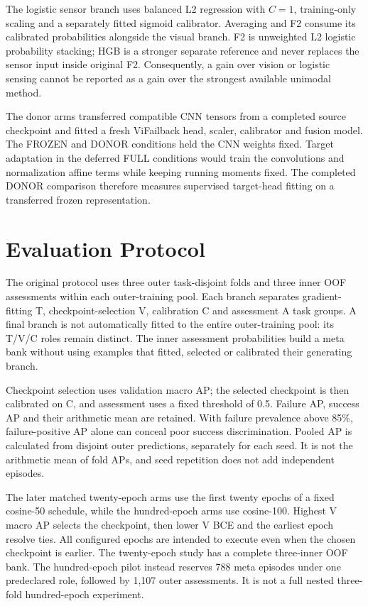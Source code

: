 The logistic sensor branch uses balanced L2 regression with $C=1$, training-only scaling and a separately fitted sigmoid calibrator. Averaging and F2 consume its calibrated probabilities alongside the visual branch. F2 is unweighted L2 logistic probability stacking; HGB is a stronger separate reference and never replaces the sensor input inside original F2. Consequently, a gain over vision or logistic sensing cannot be reported as a gain over the strongest available unimodal method.

The donor arms transferred compatible CNN tensors from a completed source checkpoint and fitted a fresh ViFailback head, scaler, calibrator and fusion model. The FROZEN and DONOR conditions held the CNN weights fixed. Target adaptation in the deferred FULL conditions would train the convolutions and normalization affine terms while keeping running moments fixed. The completed DONOR comparison therefore measures supervised target-head fitting on a transferred frozen representation.

\section{Evaluation Protocol}
The original protocol uses three outer task-disjoint folds and three inner OOF assessments within each outer-training pool. Each branch separates gradient-fitting T, checkpoint-selection V, calibration C and assessment A task groups. A final branch is not automatically fitted to the entire outer-training pool: its T/V/C roles remain distinct. The inner assessment probabilities build a meta bank without using examples that fitted, selected or calibrated their generating branch.

Checkpoint selection uses validation macro AP; the selected checkpoint is then calibrated on C, and assessment uses a fixed threshold of 0.5. Failure AP, success AP and their arithmetic mean are retained. With failure prevalence above 85\%, failure-positive AP alone can conceal poor success discrimination. Pooled AP is calculated from disjoint outer predictions, separately for each seed. It is not the arithmetic mean of fold APs, and seed repetition does not add independent episodes.

The later matched twenty-epoch arms use the first twenty epochs of a fixed cosine-50 schedule, while the hundred-epoch arms use cosine-100. Highest V macro AP selects the checkpoint, then lower V BCE and the earliest epoch resolve ties. All configured epochs are intended to execute even when the chosen checkpoint is earlier. The twenty-epoch study has a complete three-inner OOF bank. The hundred-epoch pilot instead reserves 788 meta episodes under one predeclared role, followed by 1,107 outer assessments. It is not a full nested three-fold hundred-epoch experiment.

